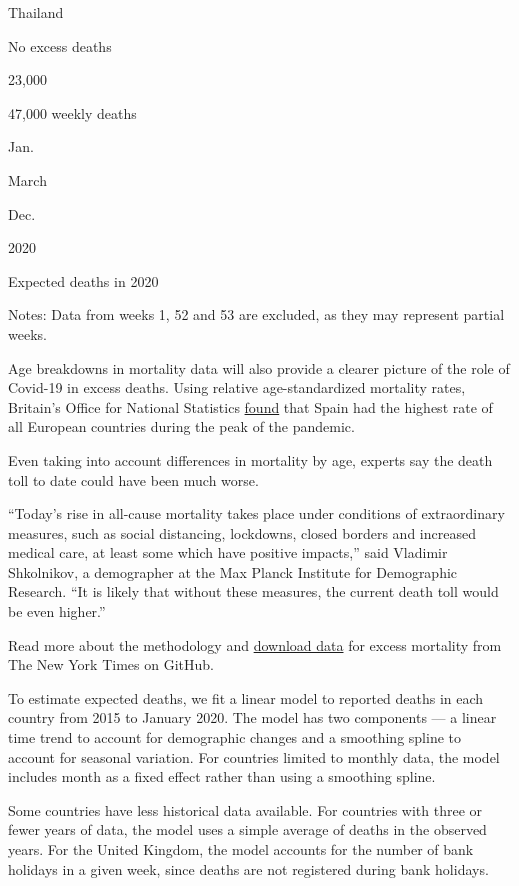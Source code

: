 Thailand

No excess deaths

23,000

47,000 weekly deaths

Jan.

March

Dec.

2020

Expected deaths in 2020

Notes: Data from weeks 1, 52 and 53 are excluded, as they may represent
partial weeks.

Age breakdowns in mortality data will also provide a clearer picture of
the role of Covid-19 in excess deaths. Using relative age-standardized
mortality rates, Britain's Office for National Statistics
\href{https://www.ons.gov.uk/peoplepopulationandcommunity/birthsdeathsandmarriages/deaths/articles/comparisonsofallcausemortalitybetweeneuropeancountriesandregions/januarytojune2020\#age-standardised-mortality-rates}{found}
that Spain had the highest rate of all European countries during the
peak of the pandemic.

Even taking into account differences in mortality by age, experts say
the death toll to date could have been much worse.

``Today's rise in all-cause mortality takes place under conditions of
extraordinary measures, such as social distancing, lockdowns, closed
borders and increased medical care, at least some which have positive
impacts,'' said Vladimir Shkolnikov, a demographer at the Max Planck
Institute for Demographic Research. ``It is likely that without these
measures, the current death toll would be even higher.''

Read more about the methodology and
\href{https://github.com/nytimes/covid-19-data/tree/master/excess-deaths}{download
data} for excess mortality from The New York Times on GitHub.

To estimate expected deaths, we fit a linear model to reported deaths in
each country from 2015 to January 2020. The model has two components ---
a linear time trend to account for demographic changes and a smoothing
spline to account for seasonal variation. For countries limited to
monthly data, the model includes month as a fixed effect rather than
using a smoothing spline.

Some countries have less historical data available. For countries with
three or fewer years of data, the model uses a simple average of deaths
in the observed years. For the United Kingdom, the model accounts for
the number of bank holidays in a given week, since deaths are not
registered during bank holidays.

